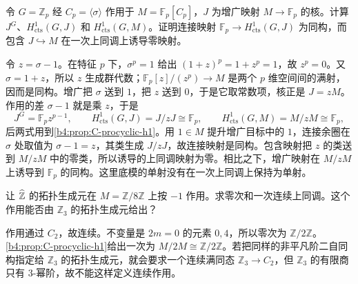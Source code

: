 \begin{exercise}\label{b4:ex:C-invariants-not-exact}
	令 \(G=\mathbb Z_p\) 经 \(C_p=\langle\sigma\rangle\) 作用于 \(M=\mathbb F_p[C_p]\)，\(J\) 为增广映射 \(M\to\mathbb F_p\) 的核。计算 \(J^G\)、\(H^1_{\mathrm{cts}}(G,J)\) 和 \(H^1_{\mathrm{cts}}(G,M)\)。证明连接映射 \(\mathbb F_p\to H^1_{\mathrm{cts}}(G,J)\) 为同构，而包含 \(J\hookrightarrow M\) 在一次上同调上诱导零映射。
\end{exercise}
\begin{solution}
	令 \(z=\sigma-1\)。在特征 \(p\) 下，\(\sigma^p=1\) 给出 \((1+z)^p=1+z^p=1\)，故 \(z^p=0\)。又 \(\sigma=1+z\)，所以 \(z\) 生成群代数；\(\mathbb F_p[z]/(z^p)\to M\) 是两个 \(p\) 维空间间的满射，因而是同构。增广把 \(\sigma\) 送到 \(1\)，把 \(z\) 送到 \(0\)，于是它取常数项，核正是 \(J=zM\)。作用的差 \(\sigma-1\) 就是乘 \(z\)，于是
	\[
		J^G=\mathbb F_p z^{p-1},\qquad H^1_{\mathrm{cts}}(G,J)=J/zJ\cong\mathbb F_p,\qquad H^1_{\mathrm{cts}}(G,M)=M/zM\cong\mathbb F_p,
	\]
	后两式用到\cref{b4:prop:C-procyclic-h1}。用 \(1\in M\) 提升增广目标中的 \(1\)，连接余圈在 \(\sigma\) 处取值为 \(\sigma-1=z\)，其类生成 \(J/zJ\)，故连接映射是同构。包含映射把 \(z\) 的类送到 \(M/zM\) 中的零类，所以诱导的上同调映射为零。相比之下，增广映射在 \(M/zM\) 上诱导到 \(\mathbb F_p\) 的同构。这里底模的单射没有在一次上同调上保持为单射。
\end{solution}

\begin{exercise}\label{b4:ex:C-sign-action}
	让 \(\widehat{\vphantom{Z}\mathbb Z}\) 的拓扑生成元在 \(M=\mathbb Z/8\mathbb Z\) 上按 \(-1\) 作用。求零次和一次连续上同调。这个作用能否由 \(\mathbb Z_3\) 的拓扑生成元给出？
\end{exercise}
\begin{solution}
	作用通过 \(C_2\)，故连续。不变量是 \(2m=0\) 的元素 \(0,4\)，所以零次为 \(\mathbb Z/2\mathbb Z\)。\cref{b4:prop:C-procyclic-h1}给出一次为 \(M/2M\cong\mathbb Z/2\mathbb Z\)。若把同样的非平凡阶二自同构指定给 \(\mathbb Z_3\) 的拓扑生成元，就会要求一个连续满同态 \(\mathbb Z_3\rightarrow C_2\)，但 \(\mathbb Z_3\) 的有限商只有 \(3\)-幂阶，故不能这样定义连续作用。
\end{solution}

